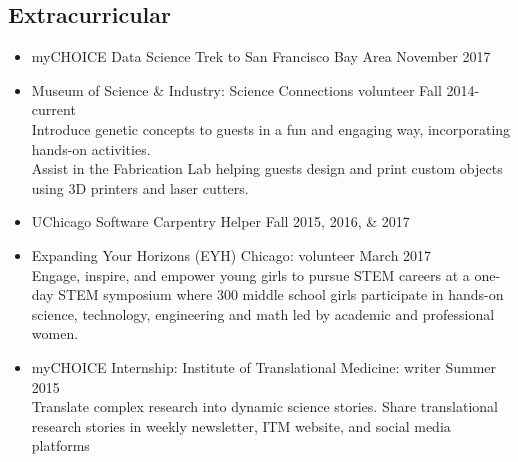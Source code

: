 \documentclass[a4paper, 11pt]{article}
\begin{document}
\subsection*{Extracurricular}
\begin{itemize}
	\item myCHOICE Data Science Trek to San Francisco Bay Area \hfill November 2017
	\item Museum of Science \& Industry: Science Connections volunteer \hfill Fall 2014-current \\
		Introduce genetic concepts to guests in a fun and engaging way, incorporating hands-on activities.\\Assist in the Fabrication Lab helping guests design and print custom objects using 3D printers and laser cutters.
	\item UChicago Software Carpentry Helper \hfill Fall 2015, 2016, \& 2017
	\item Expanding Your Horizons (EYH) Chicago: volunteer \hfill March 2017 \\
	Engage, inspire, and empower young girls to pursue STEM careers at a one-day STEM symposium where 300 middle school girls participate in hands-on science, technology, engineering and math led by academic and professional women.
   	\item myCHOICE Internship: Institute of Translational Medicine: writer \hfill Summer 2015\\Translate complex research into dynamic science stories. Share translational research stories in weekly newsletter, ITM website, and social media platforms

\end{itemize}




\newpage

\end{document}
